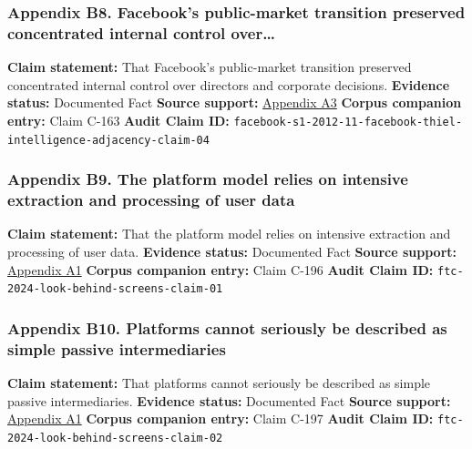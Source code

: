 \documentclass[
  american,
  11pt,
  letterpaper,
]{article}
\begin{document}
\subsubsection{Appendix B8. Facebook's public-market transition
preserved concentrated internal control
over\ldots{}}\label{appendix-b8-facebook-s-public-market-transition-preserved-concentrated-internal-control-over}

\textbf{Claim statement:} That Facebook's public-market transition
preserved concentrated internal control over directors and corporate
decisions. \textbf{Evidence status:} Documented Fact \textbf{Source
support:}
\hyperref[appendix-a3-facebook-inc-registration-statement-on-form-s-1]{Appendix
A3} \textbf{Corpus companion entry:} Claim C-163 \textbf{Audit Claim
ID:}
\texttt{facebook-s1-2012-11-facebook-thiel-intelligence-adjacency-claim-04}

\subsubsection{Appendix B9. The platform model relies on intensive
extraction and processing of user
data}\label{appendix-b9-the-platform-model-relies-on-intensive-extraction-and-processing-of-user-data}

\textbf{Claim statement:} That the platform model relies on intensive
extraction and processing of user data. \textbf{Evidence status:}
Documented Fact \textbf{Source support:}
\hyperref[appendix-a1-a-look-behind-the-screens-examining-the-data-practices-of-social-media-and-video-streaming-services]{Appendix
A1} \textbf{Corpus companion entry:} Claim C-196 \textbf{Audit Claim
ID:} \texttt{ftc-2024-look-behind-screens-claim-01}

\subsubsection{Appendix B10. Platforms cannot seriously be described as
simple passive
intermediaries}\label{appendix-b10-platforms-cannot-seriously-be-described-as-simple-passive-intermediaries}

\textbf{Claim statement:} That platforms cannot seriously be described
as simple passive intermediaries. \textbf{Evidence status:} Documented
Fact \textbf{Source support:}
\hyperref[appendix-a1-a-look-behind-the-screens-examining-the-data-practices-of-social-media-and-video-streaming-services]{Appendix
A1} \textbf{Corpus companion entry:} Claim C-197 \textbf{Audit Claim
ID:} \texttt{ftc-2024-look-behind-screens-claim-02}
\end{document}

